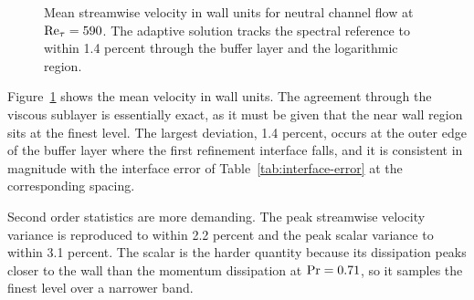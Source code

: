 \begin{figure}[t]
\centering
{}
\caption[Mean velocity profile at $\Rey_\tau = 590$]{Mean streamwise velocity in
wall units for neutral channel flow at $\Rey_\tau = 590$. The adaptive solution
tracks the spectral reference to within 1.4 percent through the buffer layer and
the logarithmic region.}
\label{fig:channel-mean}
\end{figure}

Figure~\ref{fig:channel-mean} shows the mean velocity in wall units. The
agreement through the viscous sublayer is essentially exact, as it must be given
that the near wall region sits at the finest level. The largest deviation, 1.4
percent, occurs at the outer edge of the buffer layer where the first refinement
interface falls, and it is consistent in magnitude with the interface error of
Table~\ref{tab:interface-error} at the corresponding spacing.

Second order statistics are more demanding. The peak streamwise velocity
variance is reproduced to within 2.2 percent and the peak scalar variance to
within 3.1 percent. The scalar is the harder quantity because its dissipation
peaks closer to the wall than the momentum dissipation at $\mathrm{Pr} = 0.71$, so it
samples the finest level over a narrower band.

